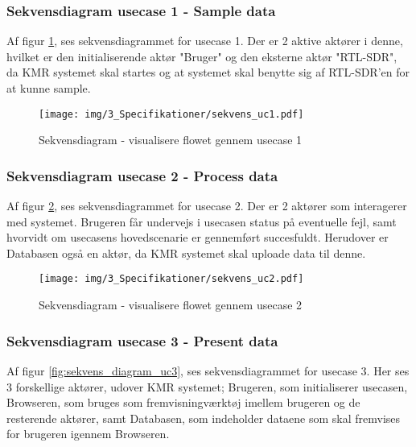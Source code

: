 \begin{appendices}
\subsubsection{Sekvensdiagram usecase 1 - Sample data}

Af figur \ref{fig:sekvens_diagram_uc1}, ses sekvensdiagrammet for usecase 1. Der er 2 aktive aktører i denne, hvilket er den initialiserende aktør "Bruger" og den eksterne aktør "RTL-SDR", da KMR systemet skal startes og at systemet skal benytte sig af RTL-SDR'en for at kunne sample.

\begin{figure}[H]
	\centering
	\texttt{[image: img/3\_Specifikationer/sekvens\_uc1.pdf]}
	\caption[Sekvensdiagram usecase 1]{Sekvensdiagram - visualisere flowet gennem usecase 1}
	\label{fig:sekvens_diagram_uc1}
\end{figure}

\subsubsection{Sekvensdiagram usecase 2 - Process data}

Af figur \ref{fig:sekvens_diagram_uc2}, ses sekvensdiagrammet for usecase 2. Der er 2 aktører som interagerer med systemet. Brugeren får undervejs i usecasen status på eventuelle fejl, samt hvorvidt om usecasens hovedscenarie er gennemført succesfuldt. Herudover er Databasen også en aktør, da KMR systemet skal uploade data til denne.

\begin{figure}[H]
	\centering
	\texttt{[image: img/3\_Specifikationer/sekvens\_uc2.pdf]}
	\caption[Sekvensdiagram usecase 2]{Sekvensdiagram - visualisere flowet gennem usecase 2}
	\label{fig:sekvens_diagram_uc2}
\end{figure}

\pagebreak

\subsubsection{Sekvensdiagram usecase 3 - Present data}

Af figur \ref{fig:sekvens_diagram_uc3}, ses sekvensdiagrammet for usecase 3. Her ses 3 forskellige aktører, udover KMR systemet; Brugeren, som initialiserer usecasen, Browseren, som bruges som fremvisningværktøj imellem brugeren og de resterende aktører, samt Databasen, som indeholder dataene som skal fremvises for brugeren igennem Browseren.


\end{appendices}
